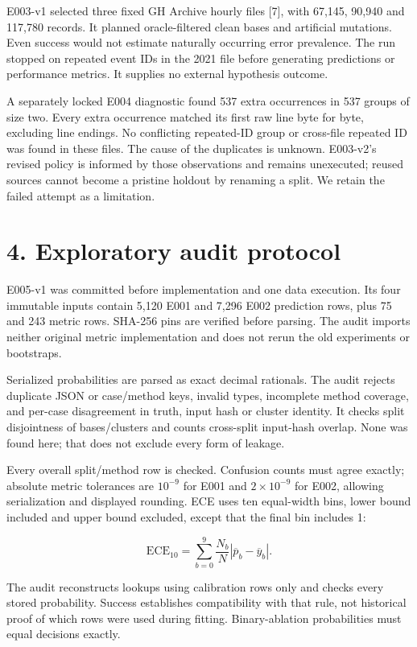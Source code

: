 E003-v1 selected three fixed GH Archive hourly files {[}7{]}, with
67,145, 90,940 and 117,780 records. It planned oracle-filtered clean
bases and artificial mutations. Even success would not estimate
naturally occurring error prevalence. The run stopped on repeated event
IDs in the 2021 file before generating predictions or performance
metrics. It supplies no external hypothesis outcome.

A separately locked E004 diagnostic found 537 extra occurrences in 537
groups of size two. Every extra occurrence matched its first raw line
byte for byte, excluding line endings. No conflicting repeated-ID group
or cross-file repeated ID was found in these files. The cause of the
duplicates is unknown. E003-v2's revised policy is informed by those
observations and remains unexecuted; reused sources cannot become a
pristine holdout by renaming a split. We retain the failed attempt as a
limitation.

\hypertarget{exploratory-audit-protocol}{%
\section{4. Exploratory audit
protocol}\label{exploratory-audit-protocol}}

E005-v1 was committed before implementation and one data execution. Its
four immutable inputs contain 5,120 E001 and 7,296 E002 prediction rows,
plus 75 and 243 metric rows. SHA-256 pins are verified before parsing.
The audit imports neither original metric implementation and does not
rerun the old experiments or bootstraps.

Serialized probabilities are parsed as exact decimal rationals. The
audit rejects duplicate JSON or case/method keys, invalid types,
incomplete method coverage, and per-case disagreement in truth, input
hash or cluster identity. It checks split disjointness of bases/clusters
and counts cross-split input-hash overlap. None was found here; that
does not exclude every form of leakage.

Every overall split/method row is checked. Confusion counts must agree
exactly; absolute metric tolerances are \(10^{-9}\) for E001 and
\(2\times10^{-9}\) for E002, allowing serialization and displayed
rounding. ECE uses ten equal-width bins, lower bound included and upper
bound excluded, except that the final bin includes 1:

\[
\mathrm{ECE}_{10}=\sum_{b=0}^{9}\frac{N_b}{N}|\overline p_b-\overline y_b|.
\]

The audit reconstructs lookups using calibration rows only and checks
every stored probability. Success establishes compatibility with that
rule, not historical proof of which rows were used during fitting.
Binary-ablation probabilities must equal decisions exactly.

